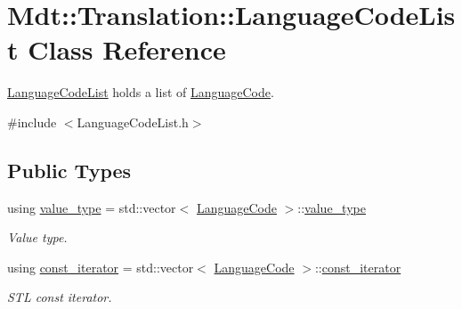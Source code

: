 \hypertarget{class_mdt_1_1_translation_1_1_language_code_list}{}\section{Mdt\+:\+:Translation\+:\+:Language\+Code\+List Class Reference}
\label{class_mdt_1_1_translation_1_1_language_code_list}


\hyperlink{class_mdt_1_1_translation_1_1_language_code_list}{Language\+Code\+List} holds a list of \hyperlink{class_mdt_1_1_translation_1_1_language_code}{Language\+Code}.  




{\ttfamily \#include $<$Language\+Code\+List.\+h$>$}

\subsection*{Public Types}
\begin{DoxyCompactItemize}
\item 
using \hyperlink{class_mdt_1_1_translation_1_1_language_code_list_a3be0ac11c787e07c63aaf6e6c29669a8}{value\+\_\+type} = std\+::vector$<$ \hyperlink{class_mdt_1_1_translation_1_1_language_code}{Language\+Code} $>$\+::\hyperlink{class_mdt_1_1_translation_1_1_language_code_list_a3be0ac11c787e07c63aaf6e6c29669a8}{value\+\_\+type}\hypertarget{class_mdt_1_1_translation_1_1_language_code_list_a3be0ac11c787e07c63aaf6e6c29669a8}{}\label{class_mdt_1_1_translation_1_1_language_code_list_a3be0ac11c787e07c63aaf6e6c29669a8}

\begin{DoxyCompactList}\small\item\em Value type. \end{DoxyCompactList}\item 
using \hyperlink{class_mdt_1_1_translation_1_1_language_code_list_a33a8deeefde68723171be04829356ea5}{const\+\_\+iterator} = std\+::vector$<$ \hyperlink{class_mdt_1_1_translation_1_1_language_code}{Language\+Code} $>$\+::\hyperlink{class_mdt_1_1_translation_1_1_language_code_list_a33a8deeefde68723171be04829356ea5}{const\+\_\+iterator}\hypertarget{class_mdt_1_1_translation_1_1_language_code_list_a33a8deeefde68723171be04829356ea5}{}\label{class_mdt_1_1_translation_1_1_language_code_list_a33a8deeefde68723171be04829356ea5}

\begin{DoxyCompactList}\small\item\em S\+TL const iterator. \end{DoxyCompactList}\end{DoxyCompactItemize}
